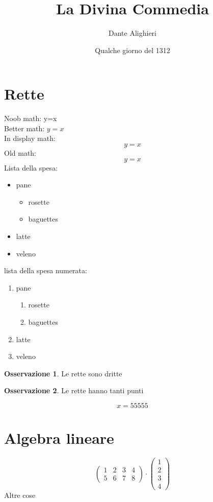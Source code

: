 \documentclass[10pt,a4paper]{article}
\author{Dante Alighieri}
\title{La Divina Commedia}
\date{Qualche giorno del 1312}
\theoremstyle{plain}
\theoremstyle{definition}
\newtheorem{osservazione}{Osservazione}
\begin{document}
\maketitle
\section{Rette}
Noob math: y=x \\
Better math: $y=x$ \\
In display math:
\[y=x\]
Old math:
$$
y=x
$$
Lista della spesa:
\begin{itemize}
	\item pane
	\begin{itemize}
		\item rosette
		\item baguettes
	\end{itemize}
	\item latte
	\item veleno
\end{itemize}
$$$$ %
lista della spesa numerata:
\begin{enumerate}[\quad\#1]
	\item pane
	\begin{enumerate}[\quad(i)]
		\item rosette
		\item baguettes
	\end{enumerate}
	\item latte
	\item veleno
\end{enumerate}

\begin{osservazione}
	Le rette sono dritte
\end{osservazione}

\begin{osservazione}
	\label{I'm so smart}
	Le rette hanno tanti punti
\end{osservazione}

\begin{equation}
x=55555
\end{equation}

\section{Algebra lineare}
$$
\begin{pmatrix}
	1 & 2 & 3 & 4 \\
	5 & 6 & 7 & 8
\end{pmatrix}
\cdot
\begin{pmatrix}
	1 \\
	2 \\
	3 \\
	4 
\end{pmatrix}
$$
Altre cose
\end{document}
